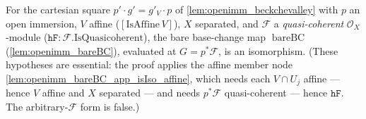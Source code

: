 \begin{lemma}
  \label{lem:openimm_bareBC_isIso}
  For the cartesian square \(p' \cdot g' = g'_V \cdot p\) of \cref{lem:openimm_beckchevalley} with
  \(p\) an open immersion, \(V\) affine (\([\mathrm{IsAffine}\,V]\)), \(X\) separated, and
  \(\mathcal{F}\) a \emph{quasi-coherent} \(\mathcal{O}_X\)-module
  (\(\mathtt{hF} : \mathcal{F}.\mathrm{IsQuasicoherent}\)), the bare base-change map
  \(\operatorname{bareBC}\) (\cref{lem:openimm_bareBC}), evaluated at \(G = p^*\mathcal{F}\), is an
  isomorphism. (These hypotheses are essential: the proof applies the affine member node
  \cref{lem:openimm_bareBC_app_isIso_affine}, which needs each \(V \cap U_j\) affine ---
  hence \(V\) affine and \(X\) separated --- and needs \(p^*\mathcal{F}\) quasi-coherent ---
  hence \(\mathtt{hF}\). The arbitrary-\(\mathcal{F}\) form is false.)
\end{lemma}
